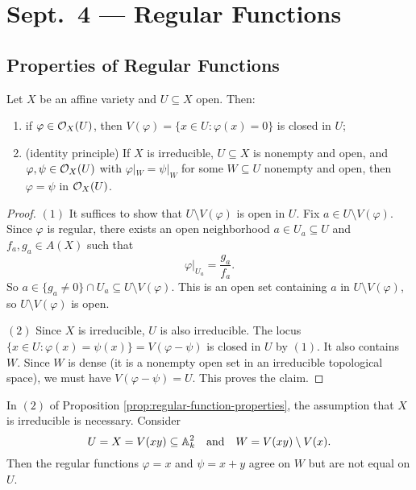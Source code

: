 \chapter{Sept.~4 --- Regular Functions}

\section{Properties of Regular Functions}

\begin{prop}\label{prop:regular-function-properties}
  Let $X$ be an affine variety and
  $U \subseteq X$ open. Then:
  \begin{enumerate}
    \item if $\varphi \in \mathcal{O}_X(U)$,
      then $V(\varphi) = \{x \in U : \varphi(x) = 0\}$
      is closed in $U$;
    \item (identity principle) If
      $X$ is irreducible, $U \subseteq X$
      is nonempty and open, and
      $\varphi, \psi \in \mathcal{O}_X(U)$ with
      $\varphi|_W = \psi|_W$ for some
      $W \subseteq U$ nonempty and open,
      then $\varphi = \psi$ in $\mathcal{O}_X(U)$.
  \end{enumerate}
\end{prop}

\begin{proof}
  $(1)$ It suffices to show that
  $U \setminus V(\varphi)$ is open in $U$.
  Fix $a \in U \setminus V(\varphi)$.
  Since $\varphi$ is regular, there exists
  an open neighborhood $a \in U_a \subseteq U$
  and $f_a, g_a \in A(X)$ such that
  \[
    \varphi|_{U_a} = \frac{g_a}{f_a}.
  \]
  So $a \in \{g_a \ne 0\} \cap U_a \subseteq U \setminus V(\varphi)$. This is
  an open set containing $a$ in
  $U \setminus V(\varphi)$, so
  $U \setminus V(\varphi)$ is open.

  $(2)$ Since $X$ is irreducible, $U$
  is also irreducible. The locus
  $\{x \in U : \varphi(x) = \psi(x)\} = V(\varphi - \psi)$
  is closed in $U$ by $(1)$. It also
  contains $W$. Since $W$ is dense
  (it is a nonempty open set in an irreducible
  topological space), we must have
  $V(\varphi - \psi) = U$.
  This proves the claim.
\end{proof}

\begin{example}
  In $(2)$ of Proposition \ref{prop:regular-function-properties}, the
  assumption that $X$ is irreducible is
  necessary. Consider
  \[
    U = X = V(xy) \subseteq \mathbb{A}_k^2
    \quad \text{and} \quad
    W = V(xy) \setminus V(x).
  \]
  Then the regular functions
  $\varphi = x$ and $\psi = x + y$
  agree on $W$ but are not equal on $U$.
\end{example}

